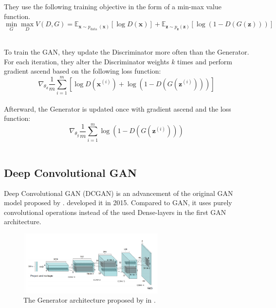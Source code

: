 They use the following training objective in the form of a  min-max value function.\\

\begin{equation}
    \min _{G} \max _{D} V(D, G)=\mathbb{E}_{\boldsymbol{x} \sim p_{\text {data }}(\boldsymbol{x})}[\log D(\boldsymbol{x})]+\mathbb{E}_{\boldsymbol{z} \sim p_{\boldsymbol{z}}(\boldsymbol{z})}[\log (1-D(G(\boldsymbol{z})))]
\end{equation}\\

\newpage

To train the GAN, they update the Discriminator more often than the Generator. For each iteration, they alter the Discriminator weights $ k $ times and perform gradient ascend based on the following loss function:\\

\begin{equation}
    \nabla_{\theta_{d}} \frac{1}{m} \sum_{i=1}^{m}\left[\log D\left(\boldsymbol{x}^{(i)}\right)+\log \left(1-D\left(G\left(\boldsymbol{z}^{(i)}\right)\right)\right)\right]
\end{equation}\\

Afterward, the Generator is updated once with gradient ascend and the loss function:\\

\begin{equation}
    \nabla_{\theta_{g}} \frac{1}{m} \sum_{i=1}^{m} \log \left(1-D\left(G\left(\boldsymbol{z}^{(i)}\right)\right)\right)
\end{equation}\\

\subsection{Deep Convolutional GAN}

Deep Convolutional GAN (DCGAN) is an advancement of the original GAN model proposed by \citeauthor{goodfellow2014generative}.  \citeauthor{radford2016dcgan} developed it in 2015. Compared to GAN, it uses purely convolutional operations instead of the used Dense-layers in the first GAN architecture.\\

\begin{figure}[H]
    \centering
    \includegraphics[width=0.65\textwidth]{resources/images/dcgan_generator.png}
    \caption{The Generator architecture proposed by \citeauthor{radford2016dcgan} in  \cite{radford2016dcgan}.}
    \label{fig:dcgan_generator}
\end{figure}

